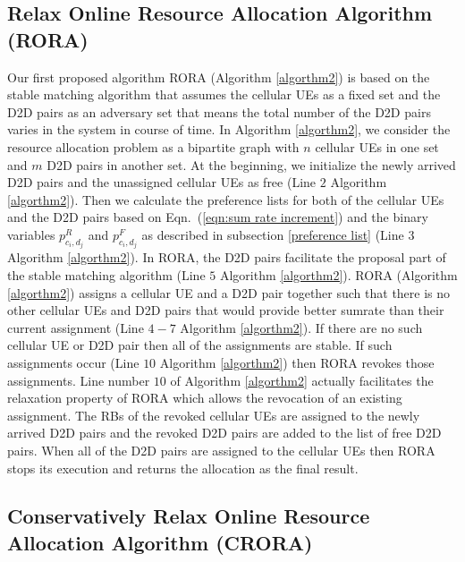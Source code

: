 \documentclass[times]{dacauth}
\begin{document}
\subsection{Relax Online Resource Allocation Algorithm (RORA)}

\medskip
\noindent
Our first proposed algorithm RORA (Algorithm \ref{algorthm2}) is based on the stable matching algorithm \cite{knuth1976mariages} that assumes the cellular UEs as a fixed set and the D2D pairs as an adversary set that means the total number of the D2D pairs varies in the system in course of time. In Algorithm \ref{algorthm2}, we consider the resource allocation problem as a bipartite graph with $n$ cellular UEs in one set and $m$ D2D pairs in another set. At the beginning, we initialize the newly arrived D2D pairs and the unassigned cellular UEs as free (Line $2$ Algorithm \ref{algorthm2}). 
Then we calculate the preference lists for both of the cellular UEs and the D2D pairs based on Eqn.~(\ref{eqn:sum rate increment}) and the binary variables $p_{c_i,d_j}^{R}$ and $p_{c_i,d_j}^{F}$ as described in subsection \ref{preference list}       (Line $3$ Algorithm \ref{algorthm2}). In RORA, the D2D pairs facilitate the proposal part of the stable matching algorithm (Line $5$ Algorithm \ref{algorthm2}). RORA (Algorithm \ref{algorthm2}) assigns a cellular UE and a D2D pair together such that there is no other cellular UEs and D2D pairs that would provide better sumrate than their current assignment (Line $4-7$ Algorithm \ref{algorthm2}). If there are no such cellular UE or D2D pair then all of the assignments are stable. If such assignments occur (Line $10$  Algorithm \ref{algorthm2}) then RORA revokes those assignments. Line number $10$ of Algorithm \ref{algorthm2} actually facilitates the relaxation property of RORA which allows the revocation of an existing assignment. The RBs of the revoked cellular UEs are assigned to the newly arrived D2D pairs and the revoked D2D pairs are added to the list of free D2D pairs. When all of the D2D pairs are assigned to the cellular UEs then RORA stops its execution and returns the allocation as the final result. 
 
 
\subsection{Conservatively Relax Online Resource Allocation Algorithm (CRORA)}
 
\end{document}
